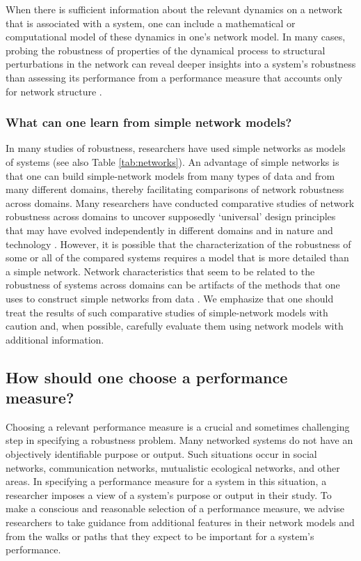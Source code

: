 \documentclass{comnet-mod}
\begin{document}
When there is sufficient information about the relevant dynamics on a network that is associated with a system, one can include a mathematical or computational model of these dynamics in one's network model. In many cases, probing the robustness of properties of the dynamical process to structural perturbations in the network can reveal deeper insights into a system's robustness than assessing its performance from a performance measure that accounts only for network structure \cite{Alderson2010, Trajanovski2013, Manzano2014, Schieber2016}.


\subsubsection{What can one learn from simple network models?}

In many studies of robustness, researchers have used simple networks as models of systems \cite{Albert2000, Callaway2000, Iyer2013, Ventresca2014} (see also Table \ref{tab:networks}). An advantage of simple networks is that one can build simple-network models from many types of data and from many different domains, thereby facilitating comparisons of network robustness across domains. Many researchers have conducted comparative studies of network robustness across domains to uncover supposedly `universal' design principles \cite{Sole2002, Demetrius2005, Wang2008, Wang2012a, Shimada2014} that may have evolved independently in different domains \cite{Hintze2008, Zhang2016a} and in nature and technology \cite{Iyer2013, Ventresca2014}. However, it is possible that the characterization of the robustness of some or all of the compared systems requires a model that is more detailed than a simple network. Network characteristics that seem to be related to the robustness of systems across domains can be artifacts of the methods that one uses to construct simple networks from data \cite{Cantwell2020}. We emphasize that one should treat the results of such comparative studies of simple-network models with caution and, when possible, carefully evaluate them using network models with additional information.


\subsection{How should one choose a performance measure?}\label{sec:choose_performance}

Choosing a relevant performance measure is a crucial and sometimes challenging step in specifying a robustness problem. Many networked systems do not have an objectively identifiable purpose or output. Such situations occur in social networks, communication networks, mutualistic ecological networks, and other areas. In specifying a performance measure for a system in this situation, a researcher imposes a view of a system's purpose or output in their study. To make a conscious and reasonable selection of a performance measure, we advise researchers to take guidance from additional features in their network models and from the walks or paths that they expect to be important for a system's performance.
\end{document}
